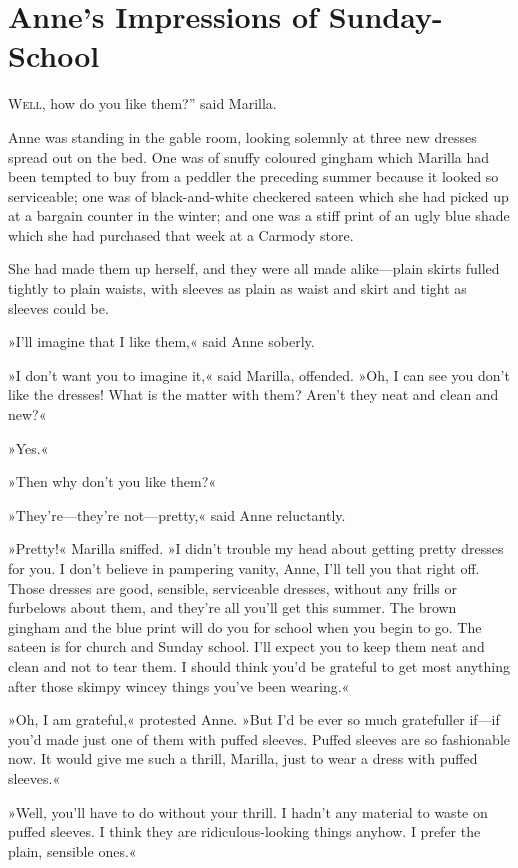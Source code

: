 \chapter{Anne's Impressions of Sunday-School}

\lettrine[ante=“,lines=4]{W}{ell}, how do you like them?” said Marilla.

\zz
Anne was standing in the gable room, looking solemnly at three new dresses spread out on the bed. One was of snuffy coloured gingham which Marilla had been tempted to buy from a peddler the preceding summer because it looked so serviceable; one was of black-and-white checkered sateen which she had picked up at a bargain counter in the winter; and one was a stiff print of an ugly blue shade which she had purchased that week at a Carmody store.

She had made them up herself, and they were all made alike—plain skirts fulled tightly to plain waists, with sleeves as plain as waist and skirt and tight as sleeves could be.

»I'll imagine that I like them,« said Anne soberly.

»I don't want you to imagine it,« said Marilla, offended. »Oh, I can see you don't like the dresses! What is the matter with them? Aren't they neat and clean and new?«

»Yes.«

»Then why don't you like them?«

»They're—they're not—pretty,« said Anne reluctantly.

»Pretty!« Marilla sniffed. »I didn't trouble my head about getting pretty dresses for you. I don't believe in pampering vanity, Anne, I'll tell you that right off. Those dresses are good, sensible, serviceable dresses, without any frills or furbelows about them, and they're all you'll get this summer. The brown gingham and the blue print will do you for school when you begin to go. The sateen is for church and Sunday school. I'll expect you to keep them neat and clean and not to tear them. I should think you'd be grateful to get most anything after those skimpy wincey things you've been wearing.«

»Oh, I am grateful,« protested Anne. »But I'd be ever so much gratefuller if—if you'd made just one of them with puffed sleeves. Puffed sleeves are so fashionable now. It would give me such a thrill, Marilla, just to wear a dress with puffed sleeves.«

»Well, you'll have to do without your thrill. I hadn't any material to waste on puffed sleeves. I think they are ridiculous-looking things anyhow. I prefer the plain, sensible ones.«

